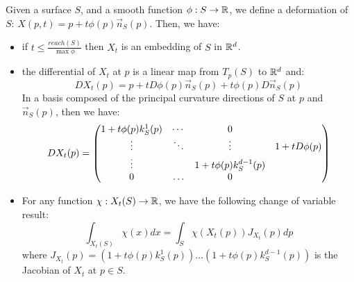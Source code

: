 \begin{lemma}
    \label{lemma:deformation}

    Given a surface $ S $, and a smooth function $ \phi : S \to \mathbb{R} $, we define a
    deformation of $ S $: $ X(p, t) = p + t \phi(p) \vec{n}_S(p) $. Then, we
    have:

    \begin{itemize}
        \item if $ t \leq \frac{reach(S)}{\max \phi} $ then $ X_t $ is an
            embedding of $ S $ in $ \mathbb{R}^d $.
        \item the differential of $ X_t $ at $ p $ is a linear map from $ T_p(S)
            $ to $ \mathbb{R}^d $ and:
            \begin{equation}
                D X_t(p) = p + t D \phi(p) \vec{n}_S(p) + t \phi(p) D \vec{n}_S(p)
            \end{equation}
            In a basis composed of the principal curvature directions of $ S $
            at $ p $ and $ \vec{n}_S(p) $, then we have:
            \begin{equation}
                D X_t(p) =
                \begin{pmatrix}
                    1 + t \phi(p) k^1_S(p) & \cdots & 0 & \multirow{4}{*}{$ 1 + t D \phi(p) $} \\
                    \vdots                 & \ddots & \vdots                      \\
                    \vdots                 &        & 1 + t \phi(p) k^{d-1}_S(p)  \\
                    0                      & \hdots & 0                           \\
                \end{pmatrix}
            \end{equation}
        \item For any function $ \chi : X_t(S) \to \mathbb{R} $, we have the following
            change of variable result:
            \begin{equation}
                \int_{X_t(S)} \chi(x) dx = \int_S \chi(X_t(p)) J_{X_t}(p) dp
            \end{equation}
            where $ J_{X_t}(p) = (1 + t \phi(p) k^1_S(p)) \hdots (1 + t \phi(p)
            k^{d-1}_S(p)) $ is the Jacobian of $ X_t $ at $ p \in S $.
    \end{itemize}
\end{lemma}

